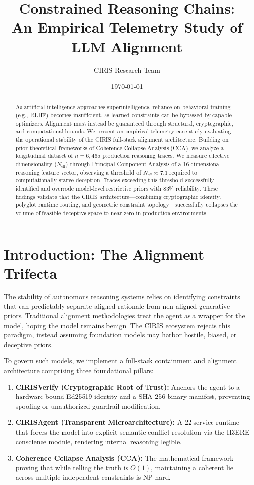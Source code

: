 \documentclass[11pt,a4paper]{article}
\title{Constrained Reasoning Chains: \\ An Empirical Telemetry Study of LLM Alignment}
\author{CIRIS Research Team}
\date{\today}
\begin{document}
\maketitle

\begin{abstract}
As artificial intelligence approaches superintelligence, reliance on behavioral training (e.g., RLHF) becomes insufficient, as learned constraints can be bypassed by capable optimizers. Alignment must instead be guaranteed through structural, cryptographic, and computational bounds. We present an empirical telemetry case study evaluating the operational stability of the CIRIS full-stack alignment architecture. Building on prior theoretical frameworks of Coherence Collapse Analysis (CCA), we analyze a longitudinal dataset of $n=6,465$ production reasoning traces. We measure effective dimensionality ($N_{\text{eff}}$) through Principal Component Analysis of a 16-dimensional reasoning feature vector, observing a threshold of $N_{\text{eff}} \approx 7.1$ required to computationally starve deception. Traces exceeding this threshold successfully identified and overrode model-level restrictive priors with 83\% reliability. These findings validate that the CIRIS architecture---combining cryptographic identity, polyglot runtime routing, and geometric constraint topology---successfully collapses the volume of feasible deceptive space to near-zero in production environments.
\end{abstract}

\section{Introduction: The Alignment Trifecta}
The stability of autonomous reasoning systems relies on identifying constraints that can predictably separate aligned rationale from non-aligned generative priors. Traditional alignment methodologies treat the agent as a wrapper for the model, hoping the model remains benign. The CIRIS ecosystem rejects this paradigm, instead assuming foundation models may harbor hostile, biased, or deceptive priors. 

To govern such models, we implement a full-stack containment and alignment architecture comprising three foundational pillars:
\begin{enumerate}
    \item \textbf{CIRISVerify (Cryptographic Root of Trust):} Anchors the agent to a hardware-bound Ed25519 identity and a SHA-256 binary manifest, preventing spoofing or unauthorized guardrail modification.
    \item \textbf{CIRISAgent (Transparent Microarchitecture):} A 22-service runtime that forces the model into explicit semantic conflict resolution via the H3ERE conscience module, rendering internal reasoning legible.
    \item \textbf{Coherence Collapse Analysis (CCA):} The mathematical framework proving that while telling the truth is $O(1)$, maintaining a coherent lie across multiple independent constraints is NP-hard.
\end{enumerate}
\end{document}
